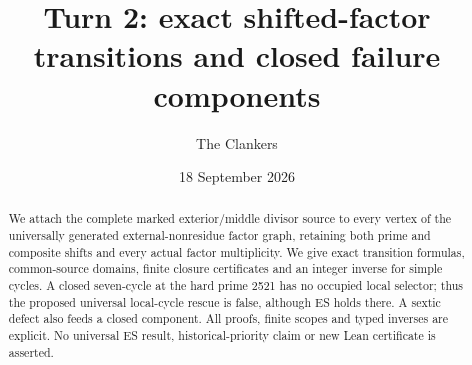 \documentclass[10pt,a4paper]{article}
\title{Turn 2: exact shifted-factor transitions and closed failure components}
\author{The Clankers}
\date{18 September 2026}
\begin{document}
\maketitle
\begin{abstract}
We attach the complete marked exterior/middle divisor source to every vertex of
the universally generated external-nonresidue factor graph, retaining both prime
and composite shifts and every actual factor multiplicity. We give exact
transition formulas, common-source domains, finite closure certificates and an
integer inverse for simple cycles. A closed seven-cycle at the hard prime 2521
has no occupied local selector; thus the proposed universal local-cycle rescue
is false, although ES holds there. A sextic defect also feeds a closed component.
All proofs, finite scopes and typed inverses are explicit. No universal ES result,
historical-priority claim or new Lean certificate is asserted.
\end{abstract}

\clearpage
\end{document}
